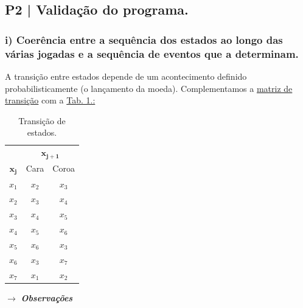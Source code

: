 \subsection{P2 | Validação do programa.}
\label{subsec:P2}

\subsubsection{i) Coerência entre a sequência dos estados ao longo das várias jogadas e a sequência de eventos que a determinam.}
\label{subsubsec:P2i}

A transição entre estados depende de um acontecimento definido probabilisticamente (o lançamento da moeda). Complementamos a \hyperref[subsec:intro]{matriz de transição} com a \hyperref[tab:state-transitions]{Tab. 1.:}

\begin{table}
  \centering
  \label{tab:state-transitions}
  \caption{Transição de estados.}
  \begin{tabular}{ccc}
    \toprule
          & \multicolumn{2}{c}{$\pmb{x_{j+1}}$} \\
    $\pmb{x_j}$ & Cara  & Coroa \\ \midrule
    $x_1$ & $x_2$ & $x_3$ \\
    $x_2$ & $x_3$ & $x_4$ \\
    $x_3$ & $x_4$ & $x_5$ \\
    $x_4$ & $x_5$ & $x_6$ \\
    $x_5$ & $x_6$ & $x_3$ \\
    $x_6$ & $x_3$ & $x_7$ \\
    $x_7$ & $x_1$ & $x_2$ \\ \bottomrule
  \end{tabular}
\end{table}

\noindent $\rightarrow$ \textbf{\textit{Observações}}

